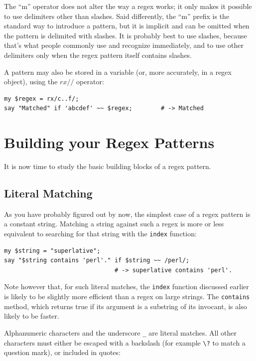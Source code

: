 The ``m'' operator does not alter the way a regex works; it 
only makes it possible to use delimiters other than slashes. 
Said differently, the ``m'' prefix is the standard way to 
introduce a pattern, but it is implicit and can be omitted 
when the pattern is delimited with slashes. It is probably best 
to use slashes, because that's what people commonly use and 
recognize immediately, and to use other delimiters only when 
the regex pattern itself contains slashes.

A pattern may also be stored in a variable (or, more 
accurately, in a regex object), using the $rx//$ operator:

\begin{verbatim}
my $regex = rx/c..f/;
say "Matched" if 'abcdef' ~~ $regex;        # -> Matched
\end{verbatim}
%


\section{Building your Regex Patterns}
\label{pattern}

It is now time to study the basic building blocks of a 
regex pattern.

\subsection{Literal Matching}

As you have probably figured out by now, the simplest case 
of a regex pattern is a constant string. Matching a string 
against such a regex is more or less equivalent to searching 
for that string with the {\tt index} function:

\begin{verbatim}
my $string = "superlative";
say "$string contains 'perl'." if $string ~~ /perl/;
                               # -> superlative contains 'perl'.
\end{verbatim}
%

Note however that, for such literal matches, the {\tt index} 
function discussed earlier is likely to be slightly more 
efficient than a regex on large strings. The {\tt contains} 
method, which returns true if its argument is a substring of 
its invocant, is also likely to be faster.

Alphanumeric characters and the underscore \verb'_' are literal 
matches. All other characters must either be escaped with a 
backslash (for example \verb'\?' to match a question mark), 
or included in quotes:

